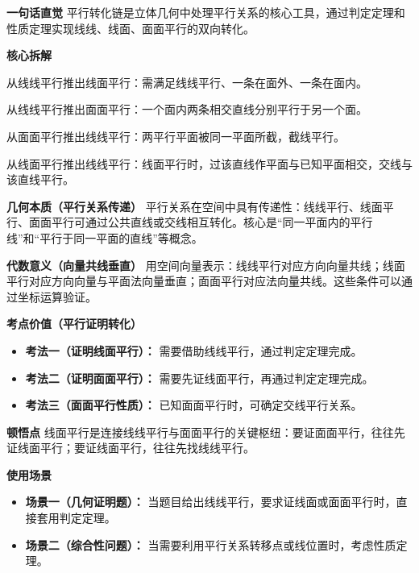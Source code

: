\begin{explanationbox}
	\textbf{\textcolor{CExplanation}{一句话直觉}}
	平行转化链是立体几何中处理平行关系的核心工具，通过判定定理和性质定理实现线线、线面、面面平行的双向转化。

	\medskip
	\textbf{\textcolor{CExplanation}{核心拆解}}
	\begin{description}[style=nextline, leftmargin=2.8em, labelsep=0.5em, itemsep=0.45em]
		\item[\textbf{要点一（线面平行判定）：}]
			从线线平行推出线面平行：需满足线线平行、一条在面外、一条在面内。
		\item[\textbf{要点二（面面平行判定）：}]
			从线线平行推出面面平行：一个面内两条相交直线分别平行于另一个面。
		\item[\textbf{要点三（面面平行性质）：}]
			从面面平行推出线线平行：两平行平面被同一平面所截，截线平行。
		\item[\textbf{要点四（线面平行性质）：}]
			从线面平行推出线线平行：线面平行时，过该直线作平面与已知平面相交，交线与该直线平行。
	\end{description}

	\medskip
	\textbf{\textcolor{CExplanation}{几何本质（平行关系传递）}}
	平行关系在空间中具有传递性：线线平行、线面平行、面面平行可通过公共直线或交线相互转化。核心是“同一平面内的平行线”和“平行于同一平面的直线”等概念。

	\medskip
	\textbf{\textcolor{CExplanation}{代数意义（向量共线垂直）}}
	用空间向量表示：线线平行对应方向向量共线；线面平行对应方向向量与平面法向量垂直；面面平行对应法向量共线。这些条件可以通过坐标运算验证。

	\medskip
	\textbf{\textcolor{CExplanation}{考点价值（平行证明转化）}}
	\begin{itemize}[leftmargin=*, itemsep=0.5em, topsep=0.4em]
		\item \textbf{考法一（证明线面平行）：} 需要借助线线平行，通过判定定理完成。
		\item \textbf{考法二（证明面面平行）：} 需要先证线面平行，再通过判定定理完成。
		\item \textbf{考法三（面面平行性质）：} 已知面面平行时，可确定交线平行关系。
	\end{itemize}

	\medskip
	\textbf{\textcolor{CExplanation}{顿悟点}}
	线面平行是连接线线平行与面面平行的关键枢纽：要证面面平行，往往先证线面平行；要证线面平行，往往先找线线平行。

	\medskip
	\textbf{\textcolor{CExplanation}{使用场景}}
	\begin{itemize}[leftmargin=*, itemsep=0.5em, topsep=0.4em]
		\item \textbf{场景一（几何证明题）：} 当题目给出线线平行，要求证线面或面面平行时，直接套用判定定理。
		\item \textbf{场景二（综合性问题）：} 当需要利用平行关系转移点或线位置时，考虑性质定理。
	\end{itemize}

\end{explanationbox}
